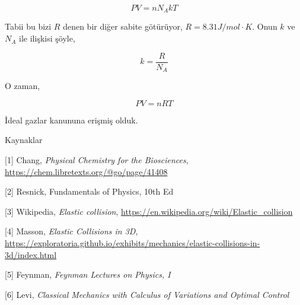 \documentclass[12pt,fleqn]{article}\usepackage{../../common}
\begin{document}
$$
PV = n N_A k T
$$

Tabii bu bizi $R$ denen bir diğer sabite götürüyor, $R = 8.31 J/mol \cdot
K$. Onun $k$ ve $N_A$ ile ilişkisi şöyle,

$$
k = \frac{R}{N_A}
$$

O zaman,

$$
PV = n R T
$$

İdeal gazlar kanununa erişmiş olduk.

Kaynaklar

[1] Chang, {\em Physical Chemistry for the Biosciences},
    \url{https://chem.libretexts.org/@go/page/41408}

[2] Resnick, Fundamentals of Physics, 10th Ed

[3] Wikipedia, {\em Elastic collision}, \url{https://en.wikipedia.org/wiki/Elastic_collision}

[4] Masson, {\em Elastic Collisions in 3D}, \url{https://exploratoria.github.io/exhibits/mechanics/elastic-collisions-in-3d/index.html}

[5] Feynman, {\em Feynman Lectures on Physics, I}

[6] Levi, {\em Classical Mechanics with Calculus of Variations and Optimal Control}
\end{document}
